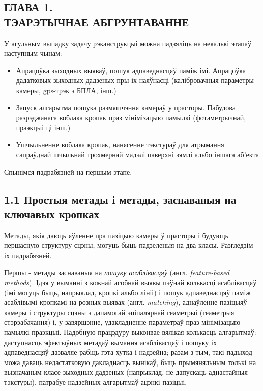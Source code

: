 \begin{center}
    \section*{ГЛАВА 1. \\ ТЭАРЭТЫЧНАЕ АБГРУНТАВАННЕ}
\end{center}

У агульным выпадку задачу рэканструкцыі можна падзяліць на некалькі этапаў наступным чынам:
\begin{itemize}
    \item Апрацоўка зыходных выяваў, пошук адпаведнасцяў паміж імі. Апрацоўка дадатковых
    зыходных дадзеных пры іх наяўнасці (калібровачныя параметры камеры, gps-трэк з БПЛА, інш.)
    \item Запуск алгарытма пошука размяшчэння камераў у прасторы. Пабудова разрэджанага воблака кропак
    праз мінімізацыю памылкі (фотаметрычнай, праэкцыі ці інш.)
    \item Ушчыльненне воблака кропак, нанясенне тэкстураў для атрымання сапраўднай шчыльнай трохмернай
    мадэлі паверхні зямлі альбо іншага аб'екта
\end{itemize}

Спынімся падрабязней на першым этапе.

\subsection*{1.1 Простыя метады і метады, заснаваныя на ключавых кропках}

Метады, якія даюць яўленне пра пазіцыю камеры ў прасторы і будуюць першасную структуру сцэны, могуць быць
падзеленыя на два класы. Разгледзім іх падрабязней.

Першы - метады заснаваныя на \textit{пошуку асаблівасцяў} (англ. \textit{feature-based methods}).
Ідэя у выманні з кожнай асобнай выявы пэўнай колькасці асаблівасцяў (імі могуць быць, напрыклад, кропкі альбо лініі) і
пошук адпаведнасцяў паміж асаблівымі кропкамі на розных выявах (англ. \textit{matching}),
аднаўленне пазіцыяў камеры і структуры сцэны з дапамогай эпіпалярнай геаметрыі (геаметрыя стэрэабачання) і,
у завяршэнне, удакладненне параметраў праз мінімізацыю памылкі праэкцыі. Падобную працэдуру выконвае
вялікая колькасць алгарытмаў: даступнасць эфектыўных метадаў вымання асаблівасцяў і пошуку іх адпаведнасцяў
дазваляе рабіць гэта хутка і надзейна; разам з тым, такі падыход можа даваць недастатковую дакладнасць вынікаў,
быць прымяняльным толькі на вызначаным класе зыходных дадзеных (напрыклад, не дапускаць аднастайныя тэкстуры),
патрабуе надзейных алгарытмаў ацэнкі пазіцыі.

